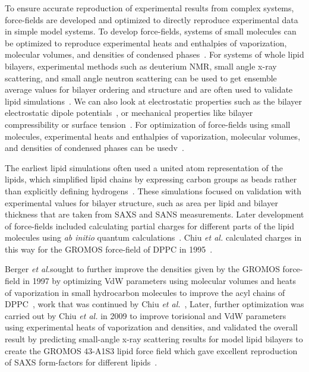 \documentclass[12pt,openany,final]{book}
\newcommand{\etal}{\textit{et al.}}
\begin{document}
To ensure accurate reproduction of experimental results from complex systems, 
force-fields are developed and optimized to directly reproduce experimental data
in simple model systems. To develop force-fields, systems of small molecules can be 
optimized to reproduce experimental heats and enthalpies of 
vaporization, molecular volumes, 
and densities of condensed phases~\cite{berger:1997,chiu:1999:optimization,chiu:2003:structure,chiu:2009}.
For systems of whole lipid bilayers, experimental methods such as deuterium NMR, small angle x-ray scattering, and small angle neutron scattering 
can be used to get ensemble average values for bilayer ordering and structure and are often used to 
validate lipid simulations~\cite{pandit:2008:simulationtextbook,fogarty:2015,chiu:2009,kruczek:2017:ether,kruczek:2017,leonard:2018,li:2017:drude,nagle:2000}.
We can also look at electrostatic properties such as the bilayer electrostatic dipole potentials~\cite{gawrisch:1992,berkowitz:2006:aqueous}, or mechanical
properties like bilayer compressibility or surface tension~\cite{kruczek:2017:ether,kruczek:2017,jahnig:1996:surface}.
For optimization of force-fields using small molecules, experimental heats and enthalpies of vaporization, molecular volumes, 
and densities of condensed phases can be usedv~\cite{berger:1997,chiu:1999:optimization,chiu:2003:structure,chiu:2009}.

The earliest lipid simulations often used a united atom representation of the lipids, which simplified lipid chains by expressing carbon groups
as beads rather than explicitly defining hydrogens~\cite{raghavan:1992,marrink:1993,egberts:1994}. These simulations focused on validation with experimental
values for bilayer structure, such as area per lipid and bilayer thickness that are taken from SAXS and SANS measurements. 
Later development of force-fields included calculating partial charges
for different parts of the lipid molecules using \emph{ab initio} quantum calculations~\cite{chiu:1995:incorporation,marrink:1993}. Chiu \etal
calculated charges in this way for the GROMOS force-field of DPPC in 1995~\cite{chiu:1995:incorporation}.

Berger \etal sought to further improve the densities given by the GROMOS force-field in 1997 
by optimizing VdW parameters using molecular volumes and
heats of vaporization in small hydrocarbon molecules to improve the acyl chains of DPPC~\cite{berger:1997},
work that was continued by Chiu \etal~\cite{chiu:1999:optimization,chiu:2003:structure}, 
Later, further optimization was carried out by Chiu \etal 
in 2009 to improve torisional and VdW parameters using experimental 
heats of vaporization and densities, and validated
the overall result by predicting small-angle x-ray scattering 
results for model lipid bilayers to create the GROMOS 43-A1S3 lipid force field which gave excellent reproduction of SAXS form-factors for
different lipids~\cite{chiu:2009}.
\end{document}
